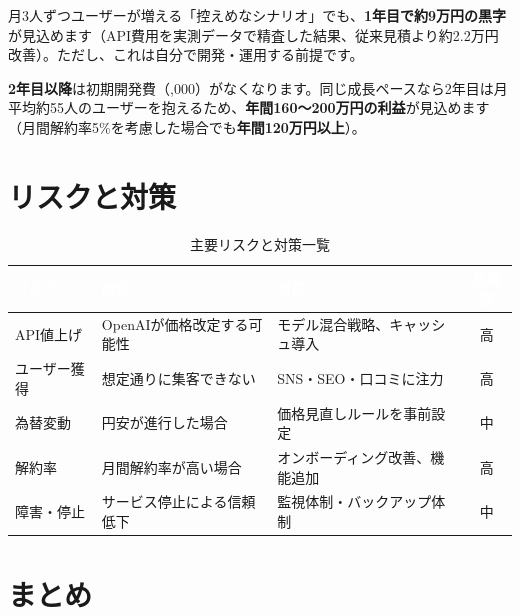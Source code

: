 \documentclass[a4paper,11pt]{ltjsarticle}
\begin{document}
\begin{infobox}[1年目の現実的な見通し]
月3人ずつユーザーが増える「控えめなシナリオ」でも、\textbf{1年目で約9万円の黒字}が見込めます（API費用を実測データで精査した結果、従来見積より約2.2万円改善）。ただし、これは自分で開発・運用する前提です。

\textbf{2年目以降}は初期開発費（,000）がなくなります。同じ成長ペースなら2年目は月平均約55人のユーザーを抱えるため、\textbf{年間160〜200万円の利益}が見込めます（月間解約率5\%を考慮した場合でも\textbf{年間120万円以上}）。
\end{infobox}


\section{リスクと対策}

\begin{table}[H]
\centering
\caption{主要リスクと対策一覧}
\begin{tabularx}{\textwidth}{lXXc}
\toprule
\rowcolor{headerblue}\textcolor{white}{\textbf{リスク}} & \textcolor{white}{\textbf{内容}} & \textcolor{white}{\textbf{対策}} & \textcolor{white}{\textbf{影響度}} \\
\midrule
API値上げ & OpenAIが価格改定する可能性 & モデル混合戦略、キャッシュ導入 & 高 \\
\rowcolor{lightgray}
ユーザー獲得 & 想定通りに集客できない & SNS・SEO・口コミに注力 & 高 \\
為替変動 & 円安が進行した場合 & 価格見直しルールを事前設定 & 中 \\
\rowcolor{lightgray}
解約率 & 月間解約率が高い場合 & オンボーディング改善、機能追加 & 高 \\
障害・停止 & サービス停止による信頼低下 & 監視体制・バックアップ体制 & 中 \\
\bottomrule
\end{tabularx}
\end{table}


\section{まとめ}
\end{document}
